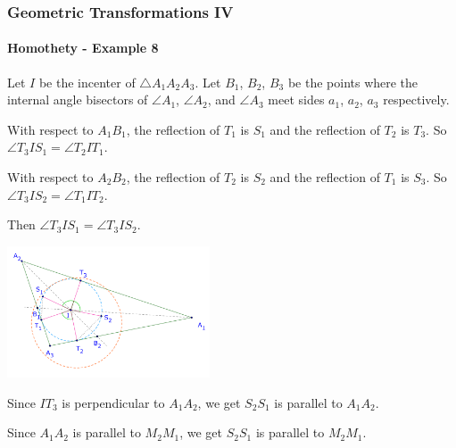 \documentclass[8pt,xcolor=table,dvipsnames]{beamer}
\begin{document}
\begin{frame}[t]
    \frametitle{Geometric Transformations IV}
    \framesubtitle{Homothety - Example 8}
    \begin{overprint}
        Let $I$ be the incenter of $\triangle A_1A_2A_3.$ Let $B_1$, $B_2$, $B_3$ be the points where the internal angle bisectors of $\angle A_1$, $\angle A_2$, and $\angle A_3$
        meet sides $a_1$, $a_2$, $a_3$ respectively.

        \bigbreak
        With respect to $A_1B_1$, the reflection of $T_1$ is $S_1$ and the reflection of $T_2$ is $T_3$. So $\angle T_3IS_1 = \angle T_2IT_1.$
        
        With respect to $A_2B_2$, the reflection of $T_2$ is $S_2$ and the reflection of $T_1$ is $S_3.$ So $\angle T_3IS_2 = \angle T_1IT_2.$

        Then $\angle T_3IS_1 = \angle T_3IS_2.$
        \begin{center}
            \includegraphics[width=6cm]{./svg/pdf/homothety-p8b.pdf}
        \end{center}
        Since $IT_3$ is perpendicular to $A_1A_2$, we get $S_2S_1$ is parallel to $A_1A_2$.
        
        Since $A_1A_2$ is parallel to $M_2M_1$, we get $S_2S_1$ is parallel to $M_2M_1.$
        

\end{overprint}
\end{frame}
\end{document}
